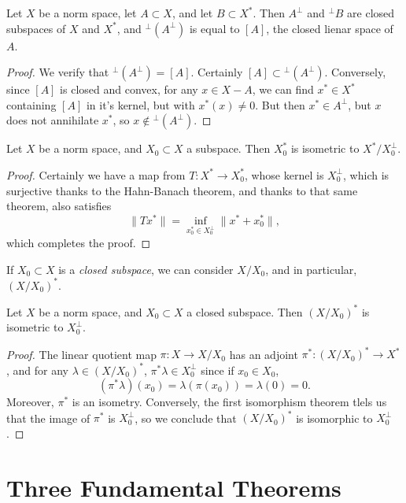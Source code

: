 \begin{theorem}
    Let $X$ be a norm space, let $A \subset X$, and let $B \subset X^*$. Then $A^\perp$ and ${}^{\perp} B$ are closed subspaces of $X$ and $X^*$, and ${}^{\perp} (A^\perp)$ is equal to $[A]$, the closed lienar space of $A$.
\end{theorem}
\begin{proof}
    We verify that ${}^{\perp} (A^\perp) = [A]$. Certainly $[A] \subset {}^{\perp} (A^\perp)$. Conversely, since $[A]$ is closed and convex, for any $x \in X - A$, we can find $x^* \in X^*$ containing $[A]$ in it's kernel, but with $x^*(x) \neq 0$. But then $x^* \in A^\perp$, but $x$ does not annihilate $x^*$, so $x \not \in {}^{\perp} (A^\perp)$.
\end{proof}

\begin{theorem}
    Let $X$ be a norm space, and $X_0 \subset X$ a subspace. Then $X_0^*$ is isometric to $X^* / X_0^\perp$.
\end{theorem}
\begin{proof}
    Certainly we have a map from $T: X^* \to X_0^*$, whose kernel is $X_0^\perp$, which is surjective thanks to the Hahn-Banach theorem, and thanks to that same theorem, also satisfies
    \[ \| Tx^* \| = \inf_{x_0^* \in X_0^\perp} \| x^* + x_0^* \|, \]
    which completes the proof.
\end{proof}

If $X_0 \subset X$ is a \emph{closed subspace}, we can consider $X / X_0$, and in particular, $(X/X_0)^*$.

\begin{theorem}
    Let $X$ be a norm space, and $X_0 \subset X$ a closed subspace. Then $(X/X_0)^*$ is isometric to $X_0^\perp$.
\end{theorem}
\begin{proof}
    The linear quotient map $\pi: X \to X / X_0$ has an adjoint $\pi^*: (X/X_0)^* \to X^*$, and for any $\lambda \in (X/X_0)^*$, $\pi^* \lambda \in X_0^\perp$ since if $x_0 \in X_0$,
    \[ (\pi^* \lambda)(x_0) = \lambda(\pi(x_0)) = \lambda(0) = 0. \]
    Moreover, $\pi^*$ is an isometry. Conversely, the first isomorphism theorem tlels us that the image of $\pi^*$ is $X_0^\perp$, so we conclude that $(X/X_0)^*$ is isomorphic to $X_0^\perp$.
\end{proof}

\section{Three Fundamental Theorems}

